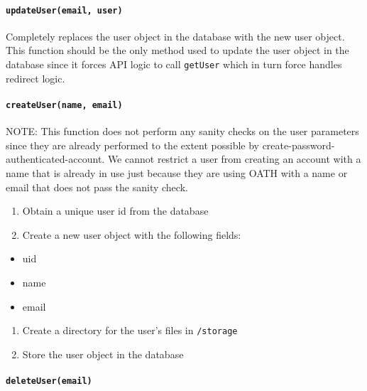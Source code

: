 \hypertarget{updateuseremail-user}{%
\paragraph{\texorpdfstring{\texttt{updateUser(email,\ user)}}{updateUser(email, user)}}\label{updateuseremail-user}}

Completely replaces the user object in the database with the new user
object. This function should be the only method used to update the user
object in the database since it forces API logic to call
\texttt{getUser} which in turn force handles redirect logic.

\hypertarget{createusername-email}{%
\paragraph{\texorpdfstring{\texttt{createUser(name,\ email)}}{createUser(name, email)}}\label{createusername-email}}

NOTE: This function does not perform any sanity checks on the user
parameters since they are already performed to the extent possible by
create-password-authenticated-account. We cannot restrict a user from
creating an account with a name that is already in use just because they
are using OATH with a name or email that does not pass the sanity check.

\begin{enumerate}
\def\labelenumi{\arabic{enumi}.}
\item
  Obtain a unique user id from the database
\item
  Create a new user object with the following fields:
\end{enumerate}

\begin{itemize}
\tightlist
\item
  uid
\item
  name
\item
  email
\end{itemize}

\begin{enumerate}
\def\labelenumi{\arabic{enumi}.}
\setcounter{enumi}{2}
\item
  Create a directory for the user's files in \texttt{/storage}
\item
  Store the user object in the database
\end{enumerate}

\hypertarget{deleteuseremail}{%
\paragraph{\texorpdfstring{\texttt{deleteUser(email)}}{deleteUser(email)}}\label{deleteuseremail}}

